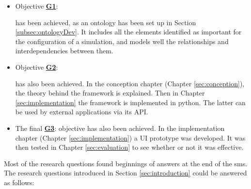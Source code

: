 \begin{itemize}
    \item Objective \hyperref[G1]{\textbf{G1}}:  
    
    has been achieved, as an ontology has been set up in Section \ref{subsec:ontologyDev}. It includes all the elements identified as important for the configuration of a simulation, and models well the relationships and interdependencies between them.
    
    
    \item Objective \hyperref[G2]{\textbf{G2}}:
    
    has also been achieved. In the conception chapter (Chapter \ref{sec:conception}), the theory behind the framework is explained. Then in Chapter \ref{sec:implementation} the framework is implemented in python. The latter can be used by external applications via its API.
    
    
    \item The final \hyperref[G3]{\textbf{G3}}: objective has also been achieved. In the implementation chapter (Chapter \ref{sec:implementation}) a UI prototype was developed. It was then tested in Chapter \ref{sec:evaluation} to see whether or not it was effective.
\end{itemize}
    
\clearpage



Most of the research questions found beginnings of answers at the end of the  \acrfull{sms}. The research questions introduced in Section \ref{sec:introduction} could be answered as follows:\\

